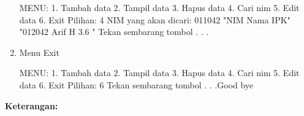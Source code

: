 \begin{enumerate}
\begin{lcverbatim}
MENU:
1. Tambah data
2. Tampil data
3. Hapus data
4. Cari nim
5. Edit data
6. Exit
Pilihan: 4
NIM yang akan dicari: 011042
"NIM  Nama  IPK" 
"012042  Arif H  3.6 "
Tekan sembarang tombol . . .
\end{lcverbatim}
\item
  Menu Exit

\begin{lcverbatim}
MENU:
1. Tambah data
2. Tampil data
3. Hapus data
4. Cari nim
5. Edit data
6. Exit
Pilihan: 6
Tekan sembarang tombol . . .Good bye
\end{lcverbatim}

\end{enumerate}

\textbf{Keterangan:}

\begin{itemize}


\end{itemize}
